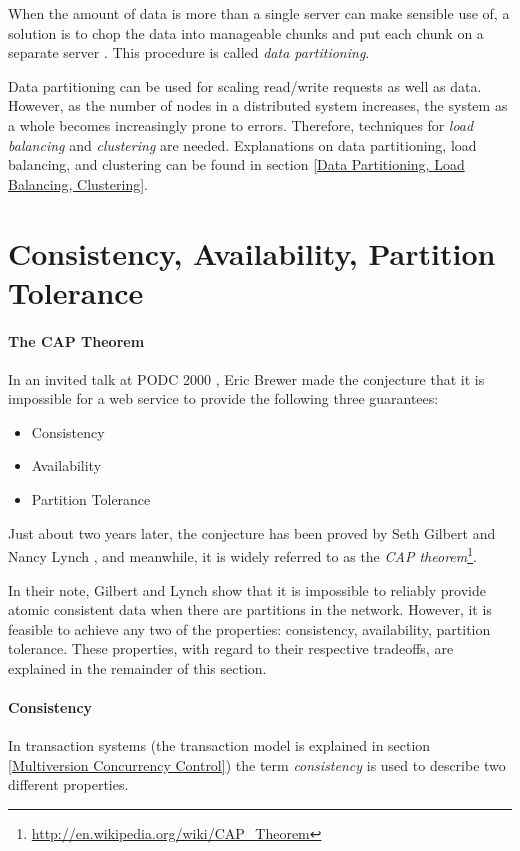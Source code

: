 When the amount of data is more than a single server can make sensible use of, a solution is to chop the data into manageable chunks and put each chunk on a separate server \cite[p.~147]{ASL10}. This procedure is called \emph{data partitioning}.

Data partitioning can be used for scaling read/write requests as well as data. However, as the number of nodes in a distributed system increases, the system as a whole becomes increasingly prone to errors. Therefore, techniques for \emph{load balancing} and \emph{clustering} are needed. Explanations on data partitioning, load balancing, and clustering can be found in section \ref{Data Partitioning, Load Balancing, Clustering}.


\section{Consistency, Availability, Partition Tolerance}
\label{Consistency, Availability, Partition Tolerance}

\paragraph{The CAP Theorem}
In an invited talk at PODC 2000 \cite{Bre00}, Eric Brewer made the conjecture that it is impossible for a web service to provide the following three guarantees:
\begin{itemize}
	\item Consistency
	\item Availability
	\item Partition Tolerance
\end{itemize}
Just about two years later, the conjecture has been proved by Seth Gilbert and Nancy Lynch \cite{GL02}, and meanwhile, it is widely referred to as the \emph{CAP theorem}\footnote{\url{http://en.wikipedia.org/wiki/CAP_Theorem}}.

In their note, Gilbert and Lynch show that it is impossible to reliably provide atomic consistent data when there are partitions in the network. However, it is feasible to achieve any two of the properties: consistency, availability, partition tolerance. These properties, with regard to their respective tradeoffs, are explained in the remainder of this section.

\paragraph{Consistency}
\label{Consistency}
In transaction systems (the transaction model is explained in section \ref{Multiversion Concurrency Control}) the term \emph{consistency} is used to describe two different properties.


